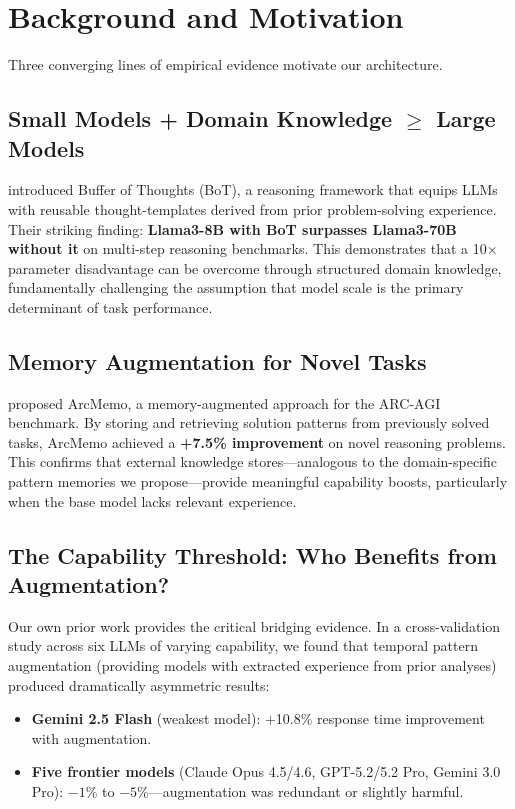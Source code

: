 \documentclass[11pt,a4paper]{article}
\begin{document}
\section{Background and Motivation}
\label{sec:background}

Three converging lines of empirical evidence motivate our architecture.

\subsection{Small Models + Domain Knowledge $\geq$ Large Models}

\citet{yang2024bot} introduced Buffer of Thoughts (BoT), a reasoning framework that equips LLMs with reusable thought-templates derived from prior problem-solving experience. Their striking finding: \textbf{Llama3-8B with BoT surpasses Llama3-70B without it} on multi-step reasoning benchmarks. This demonstrates that a 10$\times$ parameter disadvantage can be overcome through structured domain knowledge, fundamentally challenging the assumption that model scale is the primary determinant of task performance.

\subsection{Memory Augmentation for Novel Tasks}

\citet{ho2025arcmemo} proposed ArcMemo, a memory-augmented approach for the ARC-AGI benchmark. By storing and retrieving solution patterns from previously solved tasks, ArcMemo achieved a \textbf{+7.5\% improvement} on novel reasoning problems. This confirms that external knowledge stores---analogous to the domain-specific pattern memories we propose---provide meaningful capability boosts, particularly when the base model lacks relevant experience.

\subsection{The Capability Threshold: Who Benefits from Augmentation?}

Our own prior work \citep{karasi2026experience} provides the critical bridging evidence. In a cross-validation study across six LLMs of varying capability, we found that temporal pattern augmentation (providing models with extracted experience from prior analyses) produced dramatically asymmetric results:

\begin{itemize}[leftmargin=2em]
    \item \textbf{Gemini 2.5 Flash} (weakest model): +10.8\% response time improvement with augmentation.
    \item \textbf{Five frontier models} (Claude Opus 4.5/4.6, GPT-5.2/5.2 Pro, Gemini 3.0 Pro): $-1\%$ to $-5\%$---augmentation was redundant or slightly harmful.
\end{itemize}
\end{document}
